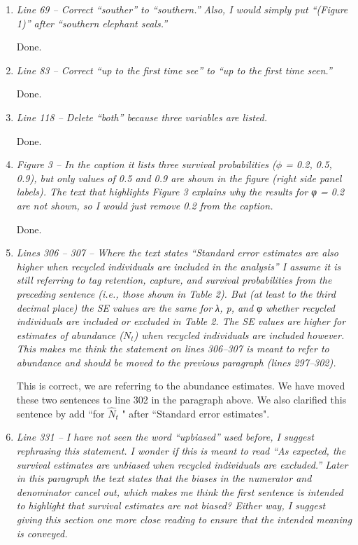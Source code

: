 \documentclass[12pt]{article}
\begin{document}
\begin{enumerate}
\item  {\it Line 69 – Correct “souther” to “southern.” Also, I would simply put “(Figure 1)” after “southern elephant seals.”}

Done.

\item  {\it Line 83 – Correct “up to the first time see” to “up to the first time seen.”}

Done.

\item  {\it Line 118 – Delete “both” because three variables are listed.}

Done.

\item {\it Figure 3 – In the caption it lists three survival probabilities ($\phi$ = 0.2, 0.5, 0.9), but only values of 0.5 and 0.9 are shown in the figure (right side panel labels). The text that highlights Figure 3 explains why the results for φ = 0.2 are not shown, so I would just remove 0.2 from the caption.}

Done.

\item {\it Lines 306 – 307 – Where the text states “Standard error estimates are also higher when recycled individuals are included in the analysis” I assume it is still referring to tag retention, capture, and survival probabilities from the preceding sentence (i.e., those shown in Table 2). But (at least to the third decimal place) the SE values are the same for λ, p, and φ whether recycled individuals are included or excluded in Table 2. The SE values are higher for estimates of abundance ($N_t$) when recycled individuals are included however. This makes me think the statement on lines 306–307 is meant to refer to abundance and should be moved to the previous paragraph (lines 297–302).}

This is correct, we are referring to the abundance estimates.  We have moved these two sentences to line 302 in the paragraph above.  We also clarified this sentence by add ``for $\hat{N}_t$ " after ``Standard error estimates".


\item {\it Line 331 – I have not seen the word “upbiased” used before, I suggest rephrasing this statement. I wonder if this is meant to read “As expected, the survival estimates are unbiased when recycled individuals are excluded.” Later in this paragraph the text states that the biases in the numerator and denominator cancel out, which makes me think the first sentence is intended to highlight that survival estimates are not biased? Either way, I suggest giving this section one more close reading to ensure that the intended meaning is conveyed.}

\end{enumerate}
\end{document}
